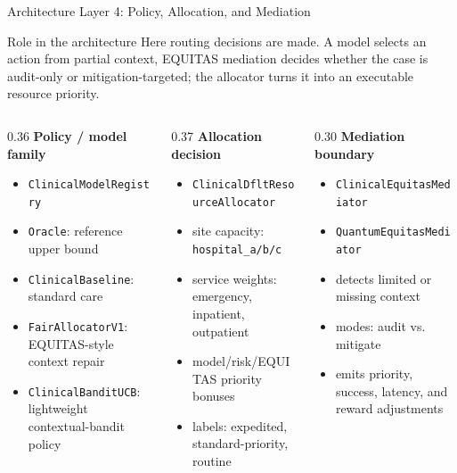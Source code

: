 \documentclass[aspectratio=169,10pt]{beamer}
\begin{document}
\begin{frame}{Architecture Layer 4: Policy, Allocation, and Mediation}
\small
\vspace{-0.2cm}
\begin{block}{Role in the architecture}
Here routing decisions are made. A model selects an action from partial context, EQUITAS mediation decides whether the case is audit-only or mitigation-targeted; the allocator turns it into an executable resource priority.
\end{block}

\vspace{-0.1cm}

\begin{columns}[T]
\begin{column}{0.36\textwidth}
\textbf{\textcolor{phase4purple}{Policy / model family}}
\begin{itemize}
    \item \texttt{ClinicalModelRegistry}
    \item \texttt{Oracle}: reference upper bound
    \item \texttt{ClinicalBaseline}: standard care
    \item \texttt{FairAllocatorV1}: EQUITAS-style context repair
    \item \texttt{ClinicalBanditUCB}: lightweight contextual-bandit policy
\end{itemize}
\end{column}

\begin{column}{0.37\textwidth}
\textbf{\textcolor{phase4purple}{Allocation decision}}
\begin{itemize}
    \item \texttt{ClinicalDfltResourceAllocator}
    \item site capacity: \texttt{hospital\_a/b/c}
    \item service weights: emergency, inpatient, outpatient
    \item model/risk/EQUITAS priority bonuses
    \item labels: expedited, standard-priority, routine
\end{itemize}
\end{column}

\begin{column}{0.30\textwidth}
\textbf{\textcolor{phase4purple}{Mediation boundary}}
\begin{itemize}
    \item \texttt{ClinicalEquitasMediator}
    \item \texttt{QuantumEquitasMediator}
    \item detects limited or missing context
    \item modes: audit vs. mitigate
    \item emits priority, success, latency, and reward adjustments
\end{itemize}
\end{column}
\end{columns}


\end{frame}
\end{document}

